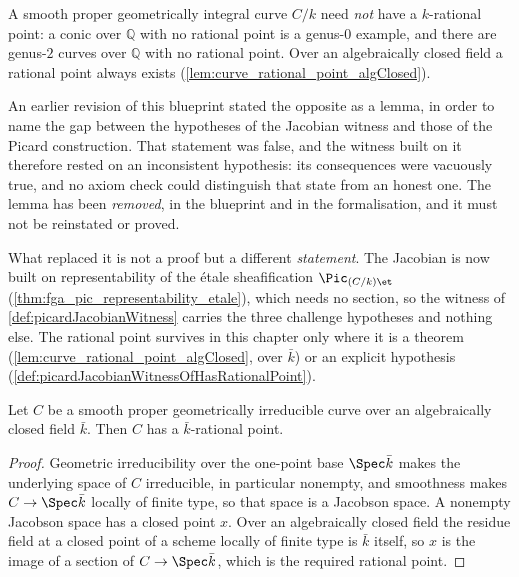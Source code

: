 \begin{remark}
  \label{lem:curve_hypothesis_gap}
  A smooth proper geometrically integral curve \(C/k\) need \emph{not} have a
  \(k\)-rational point: a conic over \(\mathbb{Q}\) with no rational point is a
  genus-\(0\) example, and there are genus-\(2\) curves over \(\mathbb{Q}\) with
  no rational point. Over an algebraically closed field a rational point always
  exists (\cref{lem:curve_rational_point_algClosed}).

  An earlier revision of this blueprint stated the opposite as a lemma, in order
  to name the gap between the hypotheses of the Jacobian witness and those of the
  Picard construction. That statement was false, and the witness built on it
  therefore rested on an inconsistent hypothesis: its consequences were vacuously
  true, and no axiom check could distinguish that state from an honest one. The
  lemma has been \emph{removed}, in the blueprint and in the formalisation, and
  it must not be reinstated or proved.

  What replaced it is not a proof but a different \emph{statement}. The Jacobian
  is now built on representability of the \'etale sheafification
  \(\Pic_{(C/k)\et}\) (\cref{thm:fga_pic_representability_etale}), which needs no
  section, so the witness of \cref{def:picardJacobianWitness} carries the three
  challenge hypotheses and nothing else. The rational point survives in this
  chapter only where it is a theorem
  (\cref{lem:curve_rational_point_algClosed}, over \(\bar k\)) or an explicit
  hypothesis (\cref{def:picardJacobianWitnessOfHasRationalPoint}).
\end{remark}

\begin{lemma}
  \label{lem:curve_rational_point_algClosed}
  \leanok
  Let \(C\) be a smooth proper geometrically irreducible curve over an algebraically
  closed field \(\bar k\). Then \(C\) has a \(\bar k\)-rational point.
\end{lemma}

\begin{proof}
  \leanok
  Geometric irreducibility over the one-point base \(\Spec \bar k\) makes the
  underlying space of \(C\) irreducible, in particular nonempty, and smoothness makes
  \(C \to \Spec \bar k\) locally of finite type, so that space is a Jacobson space.
  A nonempty Jacobson space has a closed point \(x\). Over an algebraically closed
  field the residue field at a closed point of a scheme locally of finite type is
  \(\bar k\) itself, so \(x\) is the image of a section of \(C \to \Spec \bar k\),
  which is the required rational point.
\end{proof}

